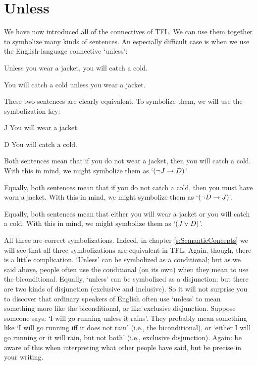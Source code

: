 \section{Unless}
We have now introduced all of the connectives of TFL. We can use them together to symbolize many kinds of sentences. An especially difficult case is when we use the English-language connective `unless':

\begin{earg}
\item[\ex{unless1}] Unless you wear a jacket, you will catch a cold.
\item[\ex{unless2}] You will catch a cold unless you wear a jacket.
\end{earg}
These two sentences are clearly equivalent. To symbolize them, we will use the symbolization key:
	\begin{ekey}
		\item[J] You will wear a jacket.
		\item[D] You will catch a cold.
	\end{ekey}
Both sentences mean that if you do not wear a jacket, then you will catch a cold. With this in mind, we might symbolize them as `$(\neg J \rightarrow D)$'.

Equally, both sentences mean that if you do not catch a cold, then you must have worn a jacket. With this in mind, we might symbolize them as `$(\neg D \rightarrow J)$'.

Equally, both sentences mean that either you will wear a jacket or you will catch a cold. With this in mind, we might symbolize them as `$(J \vee D)$'.

All three are correct symbolizations. Indeed, in chapter \ref{s:SemanticConcepts} we will see that all three symbolizations are equivalent in TFL.
Again, though, there is a little complication. `Unless' can be symbolized as a conditional; but as we said above, people often use the conditional (on its own) when they mean to use the biconditional. Equally, `unless' can be symbolized as a disjunction; but there are two kinds of disjunction (exclusive and inclusive). So it will not surprise you to discover that ordinary speakers of English often use `unless' to mean something more like the biconditional, or like exclusive disjunction. Suppose someone says: `I will go running unless it rains'. They probably mean something like `I will go running iff it does not rain' (i.e., the biconditional), or  `either I will go running or it will rain, but not both' (i.e., exclusive disjunction). Again: be aware of this when interpreting what other people have said, but be precise in your writing.

